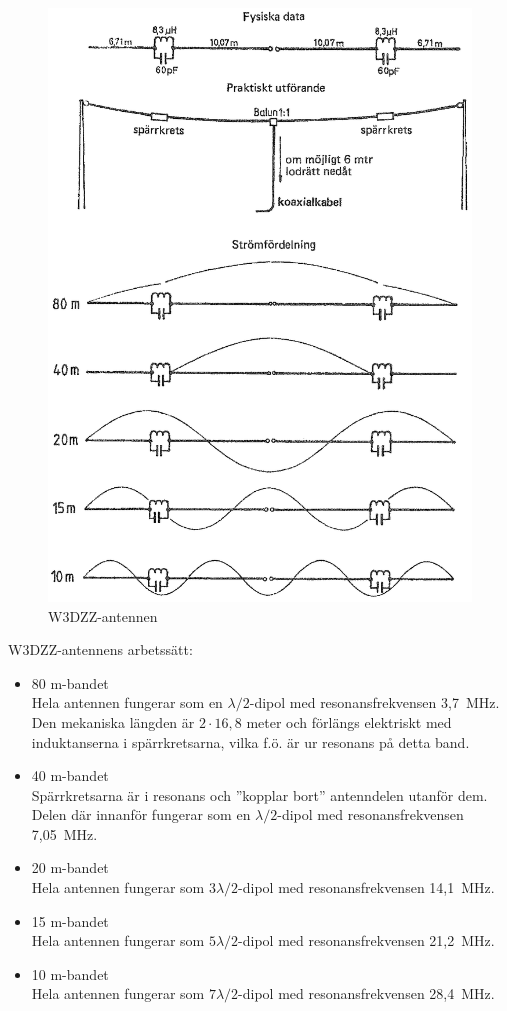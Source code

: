 \begin{figure}
  \includegraphics[width=\textwidth]{images/bild_2_6-16.png}
  \caption{W3DZZ-antennen}
  \label{fig:bildII6-16}
\end{figure}

W3DZZ-antennens arbetssätt:
\begin{itemize}
  \item 80 m-bandet \\ Hela antennen fungerar som en
    \(\lambda/2\)-dipol med resonansfrekvensen 3,7~MHz. Den mekaniska
    längden är \(2 \cdot 16,8\) meter och förlängs elektriskt med
    induktanserna i spärrkretsarna, vilka f.ö. är ur resonans på detta
    band.
  \item 40 m-bandet \\ Spärrkretsarna är i resonans och ''kopplar
    bort'' antenndelen utanför dem. Delen där innanför fungerar som en
    \(\lambda/2\)-dipol med resonansfrekvensen 7,05~MHz.

  \item 20 m-bandet \\ Hela antennen fungerar som \(3\lambda/2\)-dipol
    med resonansfrekvensen 14,1~MHz.

  \item 15 m-bandet \\ Hela antennen fungerar som \(5\lambda/2\)-dipol
    med resonansfrekvensen 21,2~MHz.

  \item 10 m-bandet \\ Hela antennen fungerar som \(7\lambda/2\)-dipol
    med resonansfrekvensen 28,4~MHz.
\end{itemize}
